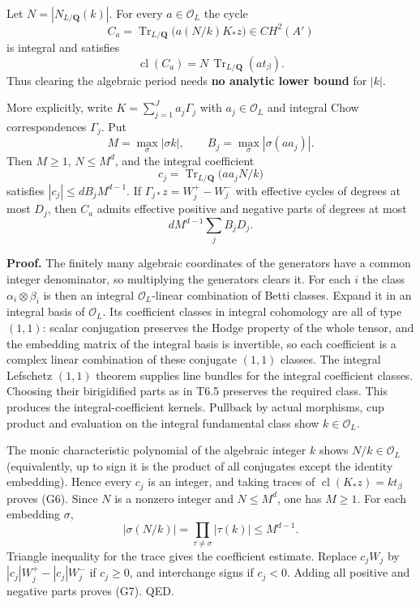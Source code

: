 \documentclass[11pt,a4paper]{article}
\theoremstyle{definition}
\begin{document}
Let \(N=|N_{L/\mathbf Q}(k)|\). For every \(a\in\mathcal O_L\) the cycle \[
C_a=\operatorname{Tr}_{L/\mathbf Q}\bigl(a(N/k)K_*z\bigr)\in CH^2(A')
\] is integral and satisfies \[
\operatorname{cl}(C_a)=N\,\operatorname{Tr}_{L/\mathbf Q}(a t_\beta).
\tag{G6}
\] Thus clearing the algebraic period needs \textbf{no analytic lower bound} for \(|k|\).

More explicitly, write \(K=\sum_{j=1}^J a_j\Gamma_j\) with \(a_j\in\mathcal O_L\) and integral Chow correspondences \(\Gamma_j\). Put \[
M=\max_\sigma|\sigma k|,\qquad B_j=\max_\sigma|\sigma(a a_j)|.
\] Then \(M\ge1\), \(N\le M^d\), and the integral coefficient \[
c_j=\operatorname{Tr}_{L/\mathbf Q}\bigl(a a_j N/k\bigr)
\] satisfies \(|c_j|\le d B_jM^{d-1}\). If \(\Gamma_{j*}z=W_j^+-W_j^-\) with effective cycles of degrees at most \(D_j\), then \(C_a\) admits effective positive and negative parts of degrees at most \[
dM^{d-1}\sum_j B_jD_j.
\tag{G7}
\]

\textbf{Proof.} The finitely many algebraic coordinates of the generators have a common integer denominator, so multiplying the generators clears it. For each \(i\) the class \(\alpha_i\otimes\beta_i\) is then an integral \(\mathcal O_L\)-linear combination of Betti classes. Expand it in an integral basis of \(\mathcal O_L\). Its coefficient classes in integral cohomology are all of type \((1,1)\): scalar conjugation preserves the Hodge property of the whole tensor, and the embedding matrix of the integral basis is invertible, so each coefficient is a complex linear combination of these conjugate \((1,1)\) classes. The integral Lefschetz \((1,1)\) theorem supplies line bundles for the integral coefficient classes. Choosing their birigidified parts as in T6.5 preserves the required class. This produces the integral-coefficient kernels. Pullback by actual morphisms, cup product and evaluation on the integral fundamental class show \(k\in\mathcal O_L\).

The monic characteristic polynomial of the algebraic integer \(k\) shows \(N/k\in\mathcal O_L\) (equivalently, up to sign it is the product of all conjugates except the identity embedding). Hence every \(c_j\) is an integer, and taking traces of \(\operatorname{cl}(K_*z)=kt_\beta\) proves (G6). Since \(N\) is a nonzero integer and \(N\le M^d\), one has \(M\ge1\). For each embedding \(\sigma\), \[
|\sigma(N/k)|=\prod_{\tau\ne\sigma}|\tau(k)|\le M^{d-1}.
\] Triangle inequality for the trace gives the coefficient estimate. Replace \(c_jW_j\) by \(|c_j|W_j^+-|c_j|W_j^-\) if \(c_j\ge0\), and interchange signs if \(c_j<0\). Adding all positive and negative parts proves (G7). QED.
\end{document}
